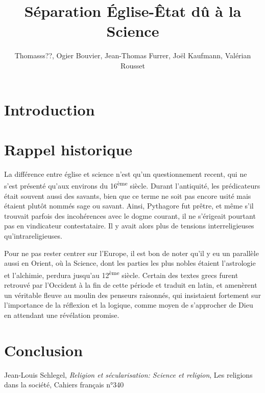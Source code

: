 \documentclass{article}
\title{S\'eparation \'Eglise-\^Etat d\^u \`a la Science}
\author{Thomasss??, Ogier Bouvier, Jean-Thomas Furrer, Jo\"el Kaufmann, Val\'erian Rousset}
\begin{document}
\maketitle

\section{Introduction}

\section{Rappel historique}

La diff\'erence entre \'eglise et science n'est qu'un questionnement recent, qui ne
s'est pr\'esent\'e qu'aux environs du 16\textsuperscript{\`eme} si\`ecle. Durant l'antiquit\'e, les pr\'edicateurs
\'etait souvent aussi des savants, bien que ce terme ne soit pas encore usit\'e
mais \'etaient plutôt nomm\'es sage ou savant. Ainsi, Pythagore fut pr\^etre, et m\^eme
s'il trouvait parfois des incoh\'erences avec le dogme courant, il ne s'\'erigeait
pourtant pas en vindicateur contestataire. Il y avait alors plus de tensions
interreligieuses qu'intrareligieuses.

Pour ne pas rester centrer sur l'Europe, il est bon de noter qu'il y eu un
parall\`ele aussi en Orient, où la Science, dont les parties les plus nobles
\'etaient l'astrologie et l'alchimie, perdura jusqu'au 12\textsuperscript{\`eme} si\`ecle.
Certain des textes grecs furent retrouv\'e par l'Occident \`a la fin de cette
p\'eriode et traduit en latin, et amen\`erent un v\'eritable fleuve au moulin des
penseurs raisonn\'es, qui insistaient fortement sur l'importance de la r\'eflexion
et la logique, comme moyen de s'approcher de Dieu en attendant une r\'ev\'elation
promise.

\section{Conclusion}

\begin{thebibliography}{9}

	Jean-Louis Schlegel,
	\emph{Religion et s\'ecularisation: Science et religion},
	Les religions dans la soci\'et\'e,
	Cahiers français n°340

\end{thebibliography}
\end{document}

